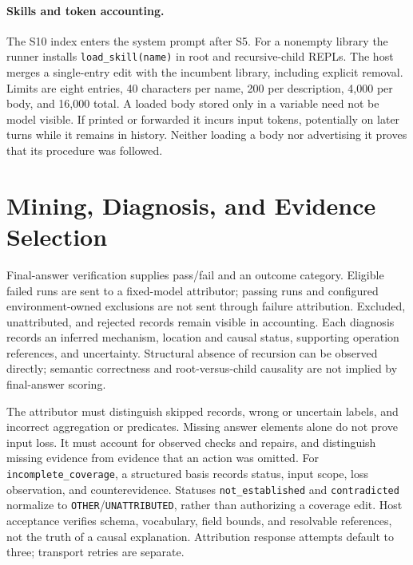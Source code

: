 \paragraph{Skills and token accounting.}
The S10 index enters the system prompt after S5. For a nonempty library the
runner installs \texttt{load\_skill(name)} in root and recursive-child REPLs.
The host merges a single-entry edit with the incumbent library, including
explicit removal. Limits are eight entries, 40 characters per name, 200 per
description, 4,000 per body, and 16,000 total. A loaded body stored only in a
variable need not be model visible. If printed or forwarded it incurs input
tokens, potentially on later turns while it remains in history. Neither loading
a body nor advertising it proves that its procedure was followed.




\section{Mining, Diagnosis, and Evidence Selection}
\label{app:mining}

Final-answer verification supplies pass/fail and an outcome category. Eligible
failed runs are sent to a fixed-model attributor; passing runs and configured
environment-owned exclusions are not sent through failure attribution. Excluded,
unattributed, and rejected records remain visible in accounting. Each diagnosis
records an inferred mechanism, location and causal status, supporting operation
references, and uncertainty. Structural absence of recursion can be observed
directly; semantic correctness and root-versus-child causality are not implied
by final-answer scoring.

The attributor must distinguish skipped records, wrong or uncertain labels, and
incorrect aggregation or predicates. Missing answer elements alone do not prove
input loss. It must account for observed checks and repairs, and distinguish
missing evidence from evidence that an action was omitted. For
\texttt{incomplete\_coverage}, a structured basis records status, input scope,
loss observation, and counterevidence. Statuses \texttt{not\_established} and
\texttt{contradicted} normalize to \texttt{OTHER}/\texttt{UNATTRIBUTED}, rather
than authorizing a coverage edit. Host acceptance verifies schema, vocabulary,
field bounds, and resolvable references, not the truth of a causal explanation.
Attribution response attempts default to three; transport retries are separate.

